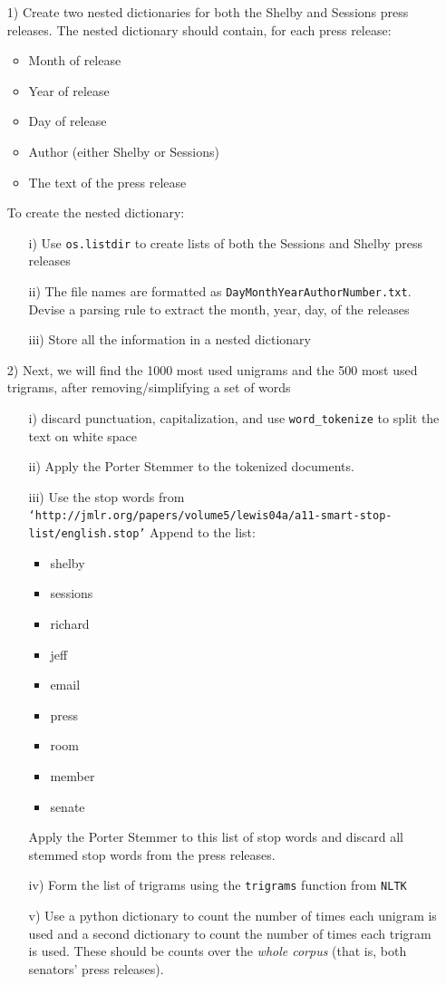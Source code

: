 \documentclass[12pt,letterpaper]{article}
\begin{document}
\begin{itemize}
\item[1)] Create two nested dictionaries for both the Shelby and Sessions press releases.  The nested dictionary should contain, for each press release:
\begin{itemize}
\item Month of release
\item Year of release
\item Day of release
\item Author (either Shelby or Sessions)
\item The text of the press release
\end{itemize}
To create the nested dictionary:
\begin{itemize}
\item[i)] Use {\tt os.listdir} to create lists of both the Sessions and Shelby press releases
\item[ii)] The file names are formatted as {\tt DayMonthYearAuthorNumber.txt}.  Devise a parsing rule to extract the month, year, day, of the releases
\item[iii)] Store all the information in a nested dictionary
\end{itemize}



\item[2)] Next, we will find the 1000 most used unigrams and the 500 most used trigrams, after removing/simplifying a set of words
\begin{itemize}
\item[i)] discard punctuation, capitalization, and use {\tt word\_tokenize} to split the text on white space
\item[ii)] Apply the Porter Stemmer to the tokenized documents.  
\item[iii)] Use the stop words from \\
{\tt `http://jmlr.org/papers/volume5/lewis04a/a11-smart-stop-list/english.stop'}
Append to the list:
\begin{itemize}
\item shelby
\item sessions
\item richard
\item jeff
\item email
\item press 
\item room
\item member 
\item senate
\end{itemize}
Apply the Porter Stemmer to this list of stop words and discard all stemmed stop words from the press releases. 
\item[iv)] Form the list of trigrams using the {\tt trigrams} function from {\tt NLTK}
\item[v)] Use a python dictionary to count the number of times each unigram is used and a second dictionary to count the number of times each trigram is used. These should be counts over the \textit{whole corpus} (that is, both senators' press releases).
\end{itemize}


\end{itemize}
\end{document}

